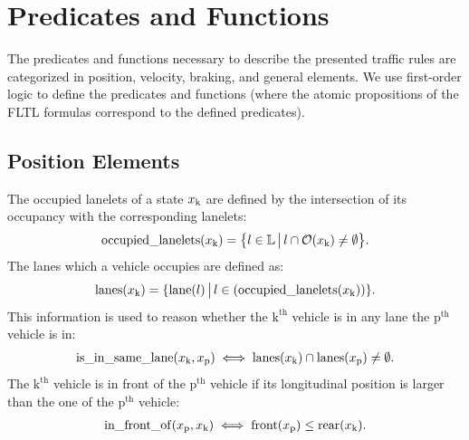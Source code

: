 
\section{Predicates and Functions}
\label{sec:predicates}

The predicates and functions necessary to describe the presented traffic rules are categorized in position, velocity, braking, and general elements.
We use first-order logic to define the predicates and functions (where the atomic propositions of the FLTL formulas correspond to the defined predicates).

\subsection{Position Elements}
The occupied lanelets of a state $x_\text{k}$ are defined by the intersection of its occupancy with the corresponding lanelets:
\begin{align*}
\operatorname*{occupied\_lanelets}(x_\text{k}) = \big\{l \in \mathbb{L}   \, \big| \, l \cap \mathcal{O}(x_\text{k}) \neq \emptyset \big\}.
\end{align*}
The lanes which a vehicle occupies are defined as:
\begin{align*}
\begin{split}
\mathrm{lanes}(x_\text{k}) = \{\mathrm{lane}(l)  \, \big| \, l \in(\operatorname*{occupied\_lanelets}(x_\text{k}))\}. 
\end{split}
\end{align*}
This information is used to reason whether the $\text{k}^\mathrm{th}$ vehicle is in any lane the $\text{p}^\mathrm{th}$ vehicle is in:
\begin{align*}
\begin{split}
\operatorname*{is\_in\_same\_lane}(x_\text{k}, x_\text{p}) \iff \mathrm{lanes}(x_\text{k}) \cap \mathrm{lanes}(x_\text{p}) \neq \emptyset. 
\end{split}
\end{align*}
The $\text{k}^\mathrm{th}$ vehicle is in front of the $\text{p}^\mathrm{th}$ vehicle if its longitudinal position is larger than the one of the $\text{p}^\mathrm{th}$ vehicle:
\begin{align*}
\operatorname*{in\_front\_of}(x_\text{p}, x_\text{k}) \iff \operatorname*{front}(x_\text{p}) \leq \operatorname*{rear}(x_\text{k}).
\end{align*}
